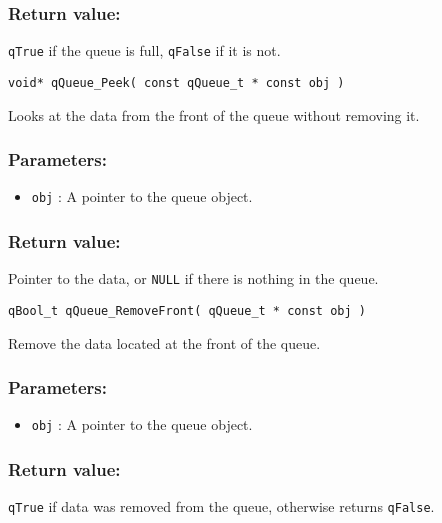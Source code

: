 \subsubsection*{Return value:}
\lstinline{qTrue} if the queue is full, \lstinline{qFalse} if it is not.

\noindent\hrulefill


\begin{lstlisting}[style=CStyle]
void* qQueue_Peek( const qQueue_t * const obj )
\end{lstlisting}

Looks at the data from the front of the queue without removing it.   

\subsubsection*{Parameters:}
\begin{itemize}
    \item \lstinline{obj} : A pointer to the queue object.
\end{itemize}

\subsubsection*{Return value:}
Pointer to the data, or \lstinline{NULL} if there is nothing in the queue.

\noindent\hrulefill


\begin{lstlisting}[style=CStyle]
qBool_t qQueue_RemoveFront( qQueue_t * const obj )
\end{lstlisting}

Remove the data located at the front of the queue. 

\subsubsection*{Parameters:}
\begin{itemize}
    \item \lstinline{obj} : A pointer to the queue object.
\end{itemize}

\subsubsection*{Return value:}
\lstinline{qTrue} if data was removed from the queue, otherwise returns \lstinline{qFalse}.

